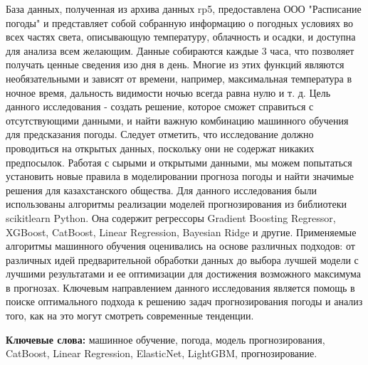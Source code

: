 База данных, полученная из архива данных rp5, предоставлена ООО
"Расписание погоды" и представляет собой собранную информацию о погодных
условиях во всех частях света, описывающую температуру, облачность и
осадки, и доступна для анализа всем желающим. Данные собираются каждые 3
часа, что позволяет получать ценные сведения изо дня в день. Многие из
этих функций являются необязательными и зависят от времени, например,
максимальная температура в ночное время, дальность видимости ночью
всегда равна нулю и т. д. Цель данного исследования - создать решение,
которое сможет справиться с отсутствующими данными, и найти важную
комбинацию машинного обучения для предсказания погоды. Следует отметить,
что исследование должно проводиться на открытых данных, поскольку они не
содержат никаких предпосылок. Работая с сырыми и открытыми данными, мы
можем попытаться установить новые правила в моделировании прогноза
погоды и найти значимые решения для казахстанского общества. Для данного
исследования были использованы алгоритмы реализации моделей
прогнозирования из библиотеки scikitlearn Python. Она содержит
регрессоры Gradient Boosting Regressor, XGBoost, CatBoost, Linear
Regression, Bayesian Ridge и другие. Применяемые алгоритмы машинного
обучения оценивались на основе различных подходов: от различных идей
предварительной обработки данных до выбора лучшей модели с лучшими
результатами и ее оптимизации для достижения возможного максимума в
прогнозах. Ключевым направлением данного исследования является помощь в
поиске оптимального подхода к решению задач прогнозирования погоды и
анализ того, как на это могут смотреть современные тенденции.

{\bfseries Ключевые слова:} машинное обучение, погода, модель
прогнозирования, CatBoost, Linear Regression, ElasticNet, LightGBM,
прогнозирование.

